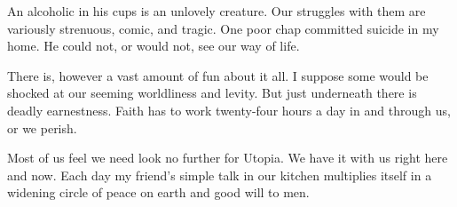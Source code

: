\begin{biblechapter}
\verse An alcoholic in his cups is an unlovely creature.  
\verse Our struggles with them are variously strenuous, comic, and tragic.  
\verse One poor chap committed suicide in my home.  
\verse He could not, or would not, see our way of life.

\verse There is, however a vast amount of fun about it all.  
\verse I suppose some would be shocked at our seeming worldliness and levity.  
\verse But just underneath there is deadly earnestness.  
\verse Faith has to work twenty-four hours a day in and through us, or we perish.

\verse Most of us feel we need look no further for Utopia.  
\verse We have it with us right here and now.  
\verse Each day my friend's simple talk in our kitchen multiplies itself 
    in a widening circle of peace on earth and good will to men.
\end{biblechapter}
